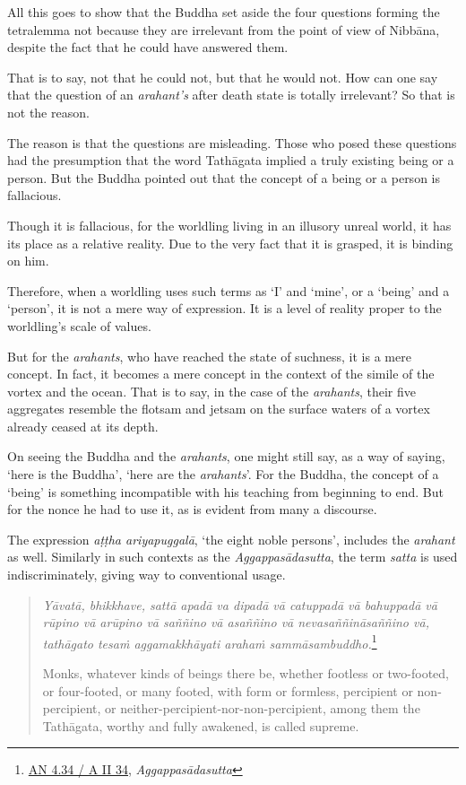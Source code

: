 All this goes to show that the Buddha set aside the four questions forming the tetralemma not because they are irrelevant from the point of view of Nibbāna, despite the fact that he could have answered them.

That is to say, not that he could not, but that he would not. How can one say that the question of an \emph{arahant's} after death state is totally irrelevant? So that is not the reason.

The reason is that the questions are misleading. Those who posed these questions had the presumption that the word Tathāgata implied a truly existing being or a person. But the Buddha pointed out that the concept of a being or a person is fallacious.

Though it is fallacious, for the worldling living in an illusory unreal world, it has its place as a relative reality. Due to the very fact that it is grasped, it is binding on him.

Therefore, when a worldling uses such terms as `I' and `mine', or a `being' and a `person', it is not a mere way of expression. It is a level of reality proper to the worldling's scale of values.

But for the \emph{arahants}, who have reached the state of suchness, it is a mere concept. In fact, it becomes a mere concept in the context of the simile of the vortex and the ocean. That is to say, in the case of the \emph{arahants}, their five aggregates resemble the flotsam and jetsam on the surface waters of a vortex already ceased at its depth.

On seeing the Buddha and the \emph{arahants}, one might still say, as a way of saying, `here is the Buddha', `here are the \emph{arahants}'. For the Buddha, the concept of a `being' is something incompatible with his teaching from beginning to end. But for the nonce he had to use it, as is evident from many a discourse.

The expression \emph{aṭṭha ariyapuggalā}, `the eight noble persons', includes the \emph{arahant} as well. Similarly in such contexts as the \emph{Aggappasādasutta}, the term \emph{satta} is used indiscriminately, giving way to conventional usage.

\begin{quote}
\emph{Yāvatā, bhikkhave, sattā apadā va dipadā vā catuppadā vā bahuppadā vā rūpino vā arūpino vā saññino vā asaññino vā nevasaññināsaññino vā, tathāgato tesaṁ aggamakkhāyati arahaṁ sammāsambuddho.}\footnote{\href{https://suttacentral.net/an4.34/pli/ms}{AN 4.34 / A II 34}, \emph{Aggappasādasutta}}

Monks, whatever kinds of beings there be, whether footless or two-footed, or four-footed, or many footed, with form or formless, percipient or non-percipient, or neither-percipient-nor-non-percipient, among them the Tathāgata, worthy and fully awakened, is called supreme.
\end{quote}

